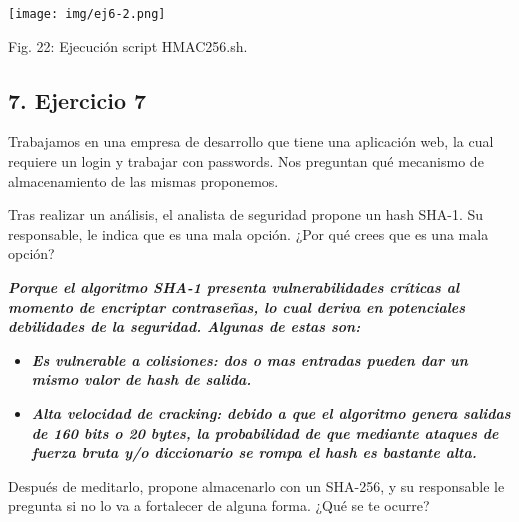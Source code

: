 \documentclass[12pt,oneside,a4paper]{book}
\newcommand{\newsection}[1]{{\subsection*{#1}
\addcontentsline{toc}{section}{#1}}}
\begin{document}
\vspace{2em}

\begin{center}
    \texttt{[image: img/ej6-2.png]}
    
\vspace{0.1em}
    
    Fig. 22: Ejecución script HMAC256.sh.
\end{center}

\newpage

\newsection{7. Ejercicio 7}

\vspace{2em}

Trabajamos en una empresa de desarrollo que tiene una aplicación web, la cual requiere un
login y trabajar con passwords. Nos preguntan qué mecanismo de almacenamiento de las
mismas proponemos.

\vspace{1em}

Tras realizar un análisis, el analista de seguridad propone un hash SHA-1. Su responsable, le indica que es una mala opción. ¿Por qué crees que es una mala opción?

\vspace{1em}

\hspace{20pt}
\textbf{\textit{Porque el algoritmo SHA-1 presenta vulnerabilidades críticas al momento de encriptar contraseñas, lo cual deriva en potenciales debilidades de la seguridad. Algunas de estas son:}}

\begin{itemize}
  \item \textbf{\textit{Es vulnerable a colisiones: dos o mas entradas pueden dar un mismo valor de hash de salida.}}
  \item \textbf{\textit{Alta velocidad de cracking: debido a que el algoritmo genera salidas de 160 bits o 20 bytes, la probabilidad de que mediante ataques de fuerza bruta y/o diccionario se rompa el hash es bastante alta.}}
\end{itemize}

\vspace{1em}

Después de meditarlo, propone almacenarlo con un SHA-256, y su responsable le pregunta si
no lo va a fortalecer de alguna forma. ¿Qué se te ocurre?

\vspace{1em}
\end{document}
